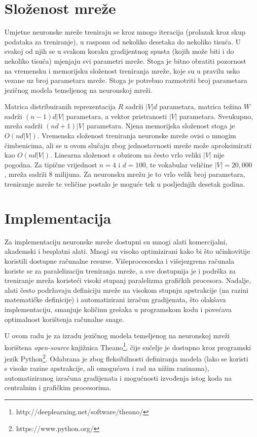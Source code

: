 \documentclass[times, utf8, diplomski, numeric]{fer}
\begin{document}
\section{Složenost mreže}

Umjetne neuronske mreže treniraju se kroz mnogo iteracija (prolazak kroz skup podataka za treniranje), u rasponu od nekoliko desetaka do nekoliko tisuća. U svakoj od njih se u svakom koraku gradijentnog spusta (kojih može biti i do nekoliko tisuća) mjenjaju svi parametri mreže. Stoga je bitno obratiti pozornost na vremensku i memorijsku složenost treniranja mreže, koje su u pravilu usko vezane uz broj parametara mreže. Stoga je potrebno razmotriti broj parametara jezičnog modela temeljenog na neuronskoj mreži.

Matrica distribuiranih reprezentacija $R$ sadrži $|V| d$ parametara, matrica težina $W$ sadrži $(n - 1) d |V|$ parametara, a vektor pristranosti $|V|$ parametara. Sveukupno, mreža sadrži $(n d + 1) |V|$ parametara. Njena memorijska složenost stoga je $O(n d |V|)$. Vremenska složenost treniranja neuronske mreže ovisi o mnogim čimbenicima, ali se u ovom slučaju zbog jednostavnosti mreže može aproksimirati kao $O(n d |V|)$. Linearna složenost s obzirom na često vrlo veliki $|V|$ nije pogodna. Za tipične vrijednost $n = 4$ i $d = 100$, te vokabular veličine $|V| = 20,000$, mreža sadrži 8 milijuna. Za neuronsku mrežu je to vrlo velik broj parametara, treniranje mreže te veličine postalo je moguće tek u posljednjih desetak godina. 

\section{Implementacija}

Za implementaciju neuronske mreže dostupni su mnogi alati komercijalni, akademski i besplatni alati. Mnogi su visoko optimizirani kako bi što učinkovitije koristili dostupne računalne resurse. Višeprocesorska i višejezgrena računala koriste se za paralelizaciju treniranja mreže, a sve dostupnija je i podrška za treniranje mreža koristeći visoki stupanj paralelizma grafičkih procesora. Nadalje, alati često podržavaju definiciju mreže na visokom stupnju apstrakcije (na razini matematičke definicije) i automatizirani izračun gradijenata, što olakšava implementaciju, smanjuje količinu grešaka u programskom kodu i povećava optimalnost korištenja računalne snage.

U ovom radu je za izradu jezičnog modela temeljenog na neuronskoj mreži korištena \textit{open-source} knjižnica Theano\footnote{http://deeplearning.net/software/theano/}, čije sučelje je dostupno kroz programski jezik Python\footnote{https://www.python.org/}. Odabrana je zbog fleksibilnosti definiranja modela (lako se koristi s visoke razine apstrakcije, ali omogućava i rad na nižim razinama), automatiziranog izračuna gradijenata i mogućnosti izvođenja istog koda na centralnim i grafičkim procesorima.
\end{document}
